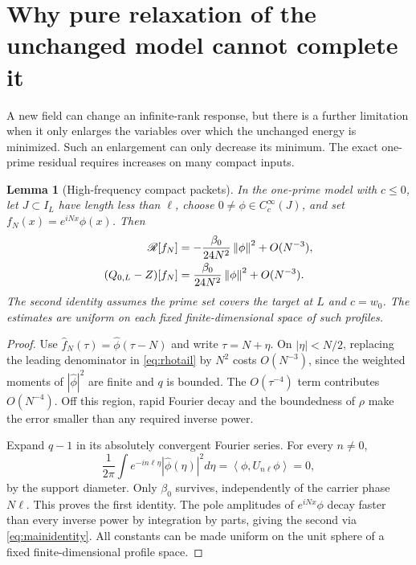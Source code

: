 \documentclass[11pt]{article}
\numberwithin{equation}{section}
\newtheorem{lemma}[theorem]{Lemma}
\theoremstyle{definition}
\theoremstyle{remark}
\newcommand{\norm}[1]{\left\lVert#1\right\rVert}
\newcommand{\ip}[2]{\left\langle#1,#2\right\rangle}
\begin{document}
\section{Why pure relaxation of the unchanged model cannot complete it}
\label{sec:relaxation}
A new field can change an infinite-rank response, but there is a further limitation when it only enlarges the variables over which the unchanged energy is minimized. Such an enlargement can only decrease its minimum. The exact one-prime residual requires increases on many compact inputs.

\begin{lemma}[High-frequency compact packets]
In the one-prime model with $c\le0$, let $J\subset I_L$ have length less than $\ell$, choose $0\ne\phi\in C_c^\infty(J)$, and set $f_N(x)=e^{iNx}\phi(x)$. Then
\begin{align}
 \mathscr R[f_N]&=-\frac{\beta_0}{24N^2}\norm\phi^2+O(N^{-3}),\notag\\
 (Q_{0,L}-Z)[f_N]&=\frac{\beta_0}{24N^2}\norm\phi^2+O(N^{-3}).
 \label{eq:packets}
\end{align}
The second identity assumes the prime set covers the target at $L$ and $c=w_0$. The estimates are uniform on each fixed finite-dimensional space of such profiles.
\end{lemma}
\begin{proof}
Use $\widehat f_N(\tau)=\widehat\phi(\tau-N)$ and write $\tau=N+\eta$. On $|\eta|<N/2$, replacing the leading denominator in \eqref{eq:rhotail} by $N^2$ costs $O(N^{-3})$, since the weighted moments of $|\widehat\phi|^2$ are finite and $q$ is bounded. The $O(\tau^{-4})$ term contributes $O(N^{-4})$. Off this region, rapid Fourier decay and the boundedness of $\rho$ make the error smaller than any required inverse power.

Expand $q-1$ in its absolutely convergent Fourier series. For every $n\ne0$,
\begin{equation}
 \frac1{2\pi}\int e^{-in\ell\eta}|\widehat\phi(\eta)|^2d\eta
 =\ip{\phi}{U_{n\ell}\phi}=0,
\end{equation}
by the support diameter. Only $\beta_0$ survives, independently of the carrier phase $N\ell$. This proves the first identity. The pole amplitudes of $e^{iNx}\phi$ decay faster than every inverse power by integration by parts, giving the second via \eqref{eq:mainidentity}. All constants can be made uniform on the unit sphere of a fixed finite-dimensional profile space.
\end{proof}
\end{document}
